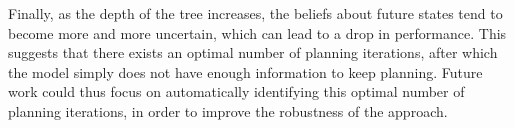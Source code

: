 \documentclass[twoside,11pt]{article}
\providecommand{\DIFaddbegin}{} %
\providecommand{\DIFaddend}{} %
\providecommand{\DIFdelbegin}{} %
\providecommand{\DIFdelend}{} %
\begin{document}
Finally, as the depth of the tree increases, the beliefs about future states tend to become more and more uncertain, which can lead to a drop in performance. This suggests that there exists an optimal number of planning iterations, after which the model simply does not have enough information to keep planning. Future work could thus focus on automatically identifying this optimal number of planning iterations, in order to improve the robustness of the approach.

\DIFdelbegin %
\DIFdelend \DIFaddbegin {}
\DIFaddend 

\vskip 0.2in

\end{document}
